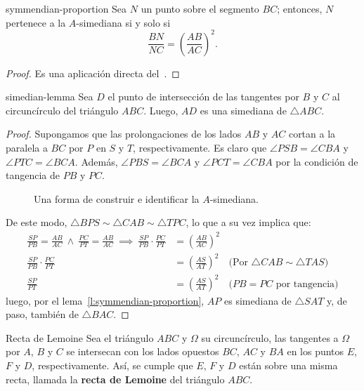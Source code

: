 \begin{section-lemma.tcb}{}{symmendian-proportion}
    Sea $N$ un punto sobre el segmento $BC$; entonces, $N$ pertenece a la $A$\nobreakdash-simediana si y solo si
    \[
        \frac{BN}{NC} = \left(\frac{AB}{AC}\right)^2.
    \]
\end{section-lemma.tcb}

\begin{proof}
    Es una aplicación directa del~.
\end{proof}


\begin{section-lemma.tcb}{}{simedian-lemma}
    Sea $D$ el punto de intersección de las tangentes por $B$ y $C$ al circuncírculo del triángulo $ABC$.
    Luego, $AD$ es una simediana de $\triangle ABC$.
\end{section-lemma.tcb}

\begin{proof}
    Supongamos que las prolongaciones de los lados $AB$ y $AC$ cortan a la paralela a $BC$ por $P$ en $S$ y $T$, respectivamente.
    Es claro que $\angle PSB = \angle CBA$ y $\angle PTC = \angle BCA$.
    Además, $\angle PBS = \angle BCA$ y $\angle PCT = \angle CBA$ por la condición de tangencia de $PB$ y $PC$.

    \begin{figure}[H]
        \centering
        
        \caption{Una forma de construir e identificar la $A$-simediana.}
    \end{figure}

    De este modo, $\triangle BPS \sim \triangle CAB \sim \triangle TPC$, lo que a su vez implica que:
    \begin{align*}
        \frac{SP}{PB} = \frac{AB}{AC} \ \land \ \frac{PC}{PT} = \frac{AB}{AC}
        \ \implies \ \frac{SP}{PB} \cdot \frac{PC}{PT} &= \left(\frac{AB}{AC}\right)^2\\
        \frac{SP}{PB} \cdot \frac{PC}{PT} &= \left(\frac{AS}{AT}\right)^2 \quad \text{(Por $\triangle CAB \sim \triangle TAS$)}\\
        \frac{SP}{PT}  &= \left(\frac{AS}{AT}\right)^2 \quad \text{($PB = PC$ por tangencia)}
    \end{align*}
    luego, por el lema~\ref{l:symmendian-proportion}, $AP$ es simediana de $\triangle SAT$ y, de paso, también de $\triangle BAC$.
\end{proof}


\begin{section-definition.tcb}{Recta de Lemoine}{}
    Sea el triángulo $ABC$ y $\Omega$ su circuncírculo, las tangentes a $\Omega$ por $A$, $B$ y $C$ se intersecan con los lados opuestos $BC$, $AC$ y $BA$ en los puntos $E$, $F$ y $D$, respectivamente.
    Así, se cumple que $E$, $F$ y $D$ están sobre una misma recta, llamada la \textbf{recta de Lemoine} del triángulo $ABC$.
\end{section-definition.tcb}







